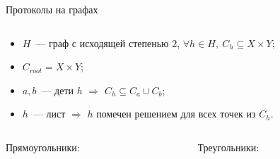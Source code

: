 \begin{frame}{Протоколы на графах}
    \vspace{-0.8cm}
    \begin{columns}[t]
        \begin{column}{0.58\textwidth}
            \begin{itemize}
                \item $H$~--- граф с исходящей степенью $2$, $\forall h \in H, ~ C_h \subseteq X \times
                    Y$;
                \item $C_{root} = X \times Y$;
                \item $a, b$~--- дети $h$ $\Rightarrow$ $C_{h} \subseteq C_{a} \cup C_{b}$;
                \item $h$~--- лист $\Rightarrow$ $h$ помечен решением для всех точек из $C_h$.
            \end{itemize}
        \end{column}

		\begin{column}{0.38\textwidth}
            \begin{center}
                
            \end{center}
		\end{column}
	\end{columns}

    \pause
    \begin{columns}[t]
		\begin{column}{0.48\textwidth}
            \begin{center}
                Прямоугольники:
                \vspace{0.2cm}
                
            \end{center}
        \end{column}

		\begin{column}{0.48\textwidth}
            \begin{center}
                Треугольники:
                \vspace{0.2cm}
                
            \end{center}
		\end{column}
	\end{columns}
\end{frame}


